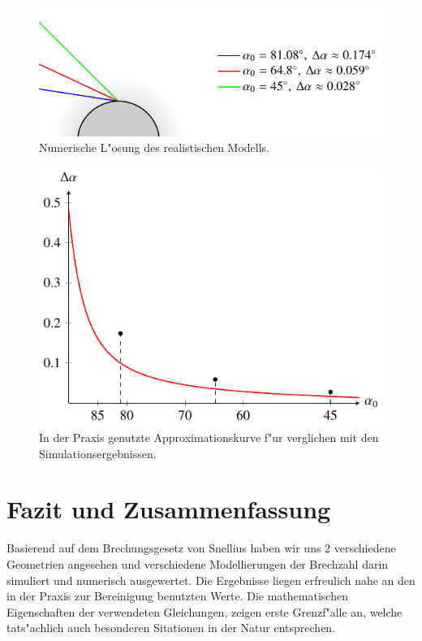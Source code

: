 \begin{refsection}
\begin{figure}
  \centering
  \includegraphics[scale=1]{licht/standalone/fig_real_simulation.pdf}
  \caption{Numerische L"osung des realistischen Modells. \label{fig:sphere_real} } 
\end{figure}

\begin{figure}
  \centering
  \includegraphics[scale=1]{licht/standalone/fig_real_comparison.pdf}
  \caption{In der Praxis genutzte Approximationskurve f"ur verglichen mit den Simulationsergebnissen. \label{fig:real_comparison}}
\end{figure}

\section{Fazit und Zusammenfassung}
Basierend auf dem Brechungsgesetz von Snellius haben wir uns 2 verschiedene Geometrien angesehen und verschiedene Modellierungen der Brechzahl darin simuliert und numerisch ausgewertet. 
Die Ergebnisse liegen erfreulich nahe an den in der Praxis zur Bereinigung benutzten Werte.
Die mathematischen Eigenschaften der verwendeten Gleichungen, zeigen erste Grenzf"alle an, welche tats"achlich auch besonderen Sitationen in der Natur entsprechen.

\printbibliography[heading=subbibliography]
\end{refsection}